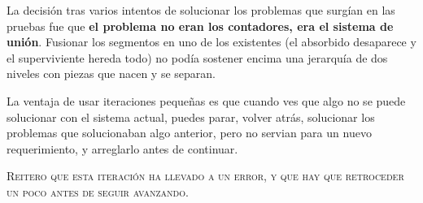 La decisión tras varios intentos de solucionar los problemas que surgían en las pruebas fue que \textbf{el problema no eran los contadores, era el sistema de unión}. Fusionar los segmentos en uno de los
existentes (el absorbido desaparece y el superviviente hereda todo) no podía
sostener encima una jerarquía de dos niveles con piezas que nacen y se separan.

La ventaja de usar iteraciones pequeñas es que cuando ves que algo no se puede solucionar con el sistema actual, puedes parar, volver atrás, solucionar los problemas que solucionaban algo anterior, pero no servian para un nuevo requerimiento, y arreglarlo antes de continuar.

\textsc{Reitero que esta iteración ha llevado a un error, y que hay que retroceder un poco antes de seguir avanzando.}

\clearpage

